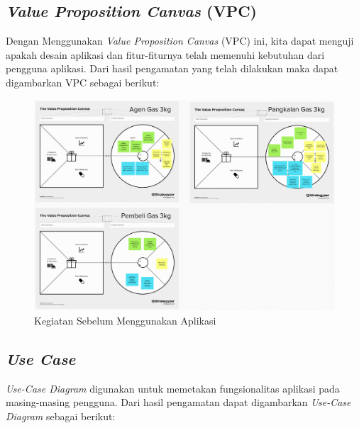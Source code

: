 	\subsection{\textit{Value Proposition Canvas }(VPC)}
	Dengan Menggunakan \textit{Value Proposition Canvas} (VPC) ini, kita dapat menguji apakah desain aplikasi dan fitur-fiturnya telah memenuhi kebutuhan dari pengguna aplikasi. Dari hasil pengamatan yang telah dilakukan maka dapat digambarkan VPC sebagai berikut:
	
		\vspace{-0.4cm}
	\begin{figure}[H]
		\center
		\includegraphics [width = 14cm]{gambar/model/VPC-Gas}
		\caption{Kegiatan Sebelum Menggunakan Aplikasi}
		\label{vpc}
	\end{figure}

	
	\subsection{\textit{Use Case}}
	\textit{Use-Case Diagram} digunakan untuk memetakan fungsionalitas aplikasi pada masing-masing pengguna. Dari hasil pengamatan dapat digambarkan \textit{Use-Case Diagram} sebagai berikut:
	
